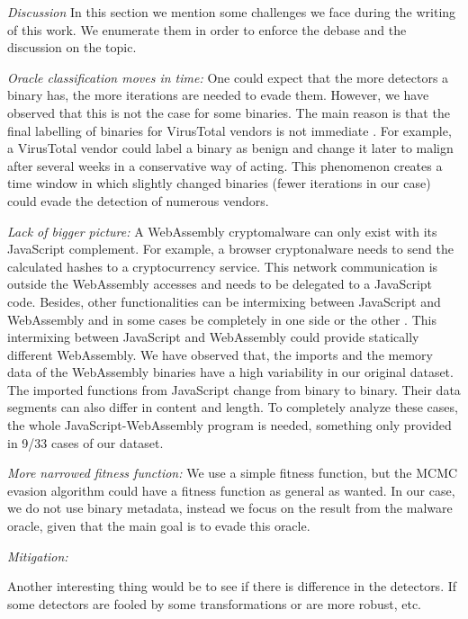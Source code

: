 \emph{Discussion}
In this section we mention some challenges we face during the writing of this work.
We enumerate them in order to enforce the debase and the discussion on the topic.

\emph{Oracle classification moves in time:}
One could expect that the more detectors a binary has, the more iterations are needed to evade them.
However, we have observed that this is not the case for some binaries.
The main reason is that the final labelling of binaries for VirusTotal vendors is not immediate \cite{251586}. 
For example, a VirusTotal vendor could label a binary as benign and change it later to malign after several weeks in a conservative way of acting.
This phenomenon creates a time window in which slightly changed binaries (fewer iterations in our case) could evade the detection of numerous vendors.

\emph{Lack of bigger picture:} A WebAssembly cryptomalware can only exist with its JavaScript complement.
For example, a browser cryptonalware needs to send the calculated hashes to a cryptocurrency service.
This network communication is outside the WebAssembly accesses and needs to be delegated to a JavaScript code.
Besides, other functionalities can be intermixing between JavaScript and WebAssembly and in some cases be completely in one side or the other \cite{romano2022wobfuscator}.
This intermixing between JavaScript and WebAssembly could provide statically different WebAssembly. 
We have observed that, the imports and the memory data of the WebAssembly binaries have a high variability in our original dataset.
The imported functions from JavaScript change from binary to binary.
Their data segments can also differ in content and length.
To completely analyze these cases, the whole JavaScript-WebAssembly program is needed, something only provided in 9/33 cases of our dataset.

\emph{More narrowed fitness function:} We use a simple fitness function, but the MCMC evasion algorithm could have a fitness function as general as wanted.
In our case, we do not use binary metadata, instead we focus on the result from the malware oracle, given that the main goal is to evade this oracle.

\emph{Mitigation: } 


Another interesting thing would be to see if there is difference in the detectors. If some detectors are fooled by some transformations or are more robust, etc.

